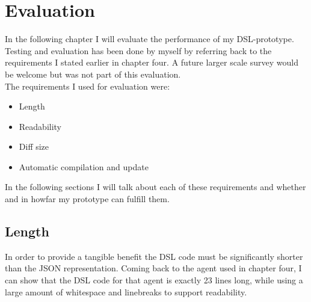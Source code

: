 \chapter{Evaluation}
In the following chapter I will evaluate the performance of my DSL-prototype.
Testing and evaluation has been done by myself by referring back to the requirements I stated earlier in chapter four. A future larger scale survey would be welcome but was not part of this evaluation.\\
The requirements I used for evaluation were:
\begin{itemize}
    \item Length
    \item Readability
    \item Diff size
    \item Automatic compilation and update
\end{itemize}

In the following sections I will talk about each of these requirements and whether and in howfar my prototype can fulfill them.

\section{Length}

In order to provide a tangible benefit the DSL code must be significantly shorter than the JSON representation. Coming back to the agent used in chapter four, I can show that the DSL code for that agent is exactly 23 lines long, while using a large amount of whitespace and linebreaks to support readability.

